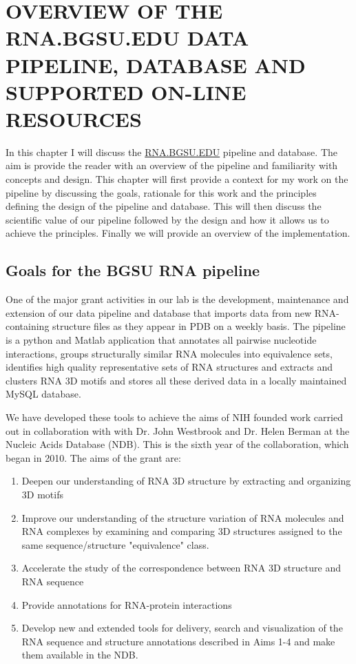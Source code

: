 \chapter{OVERVIEW OF THE RNA.BGSU.EDU DATA PIPELINE, DATABASE AND SUPPORTED
ON-LINE RESOURCES}

In this chapter I will discuss the \href{http://rna.bgsu.edu}{RNA.BGSU.EDU}
pipeline and database. The aim is provide the reader with an overview of the
pipeline and familiarity with concepts and design. This chapter will first
provide a context for my work on the pipeline by discussing the goals, rationale
for this work and the principles defining the design of the pipeline and
database. This will then discuss the scientific value of our pipeline followed
by the design and how it allows us to achieve the principles. Finally we will
provide an overview of the implementation. 

\section{Goals for the BGSU RNA pipeline}

One of the major grant activities in our lab is the development, maintenance and
extension of our data pipeline and database that imports data from new
RNA-containing structure files as they appear in PDB on a weekly basis. The
pipeline is a python and Matlab application that annotates all pairwise
nucleotide interactions, groups structurally similar RNA molecules into
equivalence sets, identifies high quality representative sets of RNA structures
and extracts and clusters RNA 3D motifs and stores all these derived data in a
locally maintained MySQL database.

We have developed these tools to achieve the aims of NIH founded work carried
out in collaboration with with Dr. John Westbrook and Dr. Helen Berman at the
Nucleic Acids Database (NDB). This is the sixth year of the collaboration, which
began in 2010. The aims of the grant are:

\begin{enumerate}
        \item Deepen our understanding of RNA 3D structure by extracting and
                organizing 3D motifs

        \item Improve our understanding of the structure variation of RNA
                molecules and RNA complexes by examining and comparing 3D
                structures assigned to the same sequence/structure "equivalence"
                class.

        \item Accelerate the study of the correspondence between RNA 3D
                structure and RNA sequence

        \item Provide annotations for RNA-protein interactions

        \item Develop new and extended tools for delivery, search and
                visualization of the RNA sequence and structure annotations
                described in Aims 1-4 and make them available in the NDB.
\end{enumerate}

